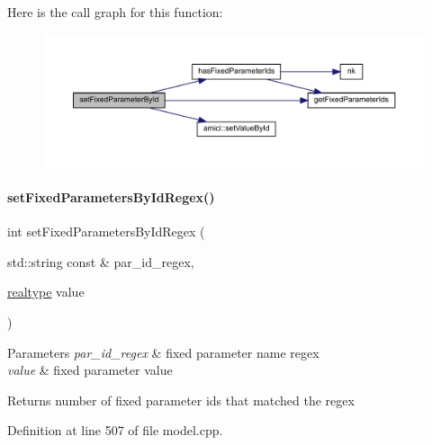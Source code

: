 Here is the call graph for this function\+:
\nopagebreak
\begin{figure}[H]
\begin{center}
\leavevmode
\includegraphics[width=350pt]{classamici_1_1_model_adc0d24343c6fed2e797fb402f7c2d256_cgraph}
\end{center}
\end{figure}
\mbox{\label{classamici_1_1_model_acda9b9debfd3d6ac77e2d27a48bfb5d6}} 
\paragraph{\texorpdfstring{set\+Fixed\+Parameters\+By\+Id\+Regex()}{setFixedParametersByIdRegex()}}
{\footnotesize\ttfamily int set\+Fixed\+Parameters\+By\+Id\+Regex (\begin{DoxyParamCaption}\item[{std\+::string const \&}]{par\+\_\+id\+\_\+regex,  }\item[{\mbox{\hyperlink{namespaceamici_a1bdce28051d6a53868f7ccbf5f2c14a3}{realtype}}}]{value }\end{DoxyParamCaption})}


\begin{DoxyParams}{Parameters}
{\em par\+\_\+id\+\_\+regex} & fixed parameter name regex \\
\hline
{\em value} & fixed parameter value \\
\hline
\end{DoxyParams}
\begin{DoxyReturn}{Returns}
number of fixed parameter ids that matched the regex 
\end{DoxyReturn}


Definition at line 507 of file model.\+cpp.

